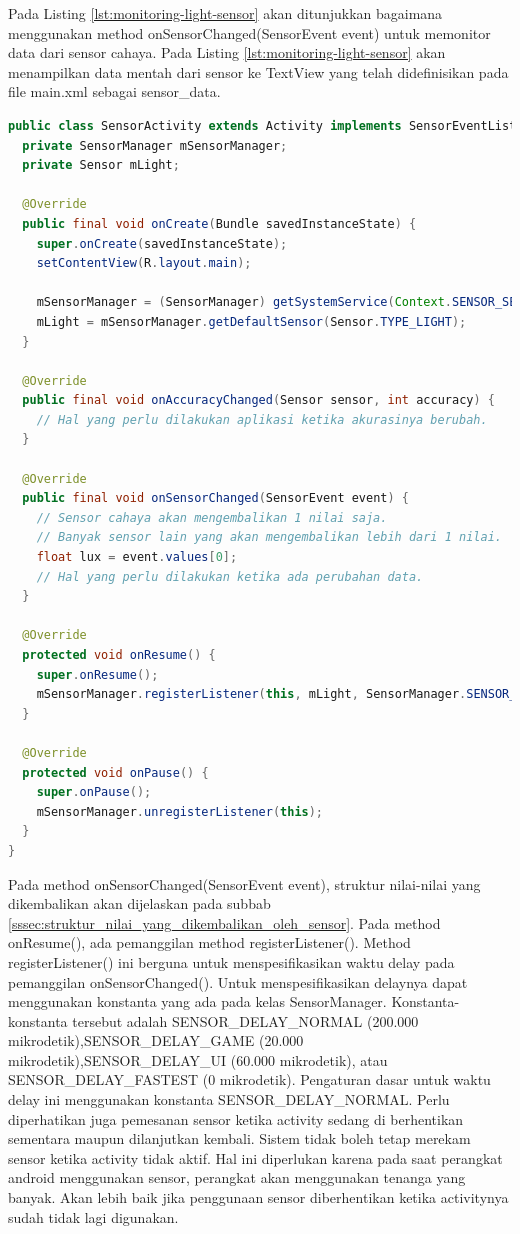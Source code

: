 Pada Listing \ref{lst:monitoring-light-sensor} akan ditunjukkan bagaimana menggunakan method onSensorChanged(SensorEvent event) untuk memonitor data dari sensor cahaya. Pada Listing \ref{lst:monitoring-light-sensor} akan menampilkan data mentah dari sensor ke TextView yang telah didefinisikan pada file main.xml sebagai sensor\_data.
\begin{lstlisting}[caption={Contoh memonitor data mentah pada sensor cahaya},label={lst:monitoring-light-sensor},language=java]
public class SensorActivity extends Activity implements SensorEventListener {
  private SensorManager mSensorManager;
  private Sensor mLight;

  @Override
  public final void onCreate(Bundle savedInstanceState) {
    super.onCreate(savedInstanceState);
    setContentView(R.layout.main);

    mSensorManager = (SensorManager) getSystemService(Context.SENSOR_SERVICE);
    mLight = mSensorManager.getDefaultSensor(Sensor.TYPE_LIGHT);
  }

  @Override
  public final void onAccuracyChanged(Sensor sensor, int accuracy) {
    // Hal yang perlu dilakukan aplikasi ketika akurasinya berubah.
  }

  @Override
  public final void onSensorChanged(SensorEvent event) {
    // Sensor cahaya akan mengembalikan 1 nilai saja.
    // Banyak sensor lain yang akan mengembalikan lebih dari 1 nilai.
    float lux = event.values[0];
    // Hal yang perlu dilakukan ketika ada perubahan data.
  }

  @Override
  protected void onResume() {
    super.onResume();
    mSensorManager.registerListener(this, mLight, SensorManager.SENSOR_DELAY_NORMAL);
  }

  @Override
  protected void onPause() {
    super.onPause();
    mSensorManager.unregisterListener(this);
  }
}
\end{lstlisting}
Pada method onSensorChanged(SensorEvent event), struktur nilai-nilai yang dikembalikan akan dijelaskan pada subbab \ref{sssec:struktur_nilai_yang_dikembalikan_oleh_sensor}. Pada method onResume(), ada pemanggilan method registerListener(). Method registerListener() ini berguna untuk menspesifikasikan waktu delay pada pemanggilan onSensorChanged(). Untuk menspesifikasikan delaynya dapat menggunakan konstanta yang ada pada kelas SensorManager. Konstanta-konstanta tersebut adalah SENSOR\_DELAY\_NORMAL (200.000 mikrodetik),SENSOR\_DELAY\_GAME (20.000 mikrodetik),SENSOR\_DELAY\_UI (60.000 mikrodetik), atau SENSOR\_DELAY\_FASTEST (0 mikrodetik). Pengaturan dasar untuk waktu delay ini menggunakan konstanta SENSOR\_DELAY\_NORMAL.
Perlu diperhatikan juga pemesanan sensor ketika activity sedang di berhentikan sementara maupun dilanjutkan kembali. Sistem tidak boleh tetap merekam sensor ketika activity tidak aktif. Hal ini diperlukan karena pada saat perangkat android menggunakan sensor, perangkat akan menggunakan tenanga yang banyak. Akan lebih baik jika penggunaan sensor diberhentikan ketika activitynya sudah tidak lagi digunakan. 
